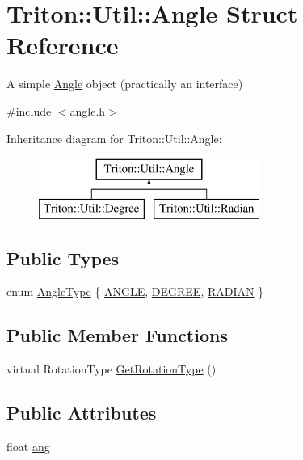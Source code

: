 \hypertarget{struct_triton_1_1_util_1_1_angle}{}\section{Triton\+:\+:Util\+:\+:Angle Struct Reference}
\label{struct_triton_1_1_util_1_1_angle}


A simple \hyperlink{struct_triton_1_1_util_1_1_angle}{Angle} object (practically an interface)  




{\ttfamily \#include $<$angle.\+h$>$}

Inheritance diagram for Triton\+:\+:Util\+:\+:Angle\+:\begin{figure}[H]
\begin{center}
\leavevmode
\includegraphics[height=2.000000cm]{struct_triton_1_1_util_1_1_angle}
\end{center}
\end{figure}
\subsection*{Public Types}
\begin{DoxyCompactItemize}
\item 
enum \hyperlink{group__lus__angle_ga38b6255184f9399841fa0b1d6bc4aa78}{Angle\+Type} \{ \hyperlink{group__lus__angle_gga38b6255184f9399841fa0b1d6bc4aa78ad5d37fcf38efdf957daee93ae0926788}{A\+N\+G\+L\+E}, 
\hyperlink{group__lus__angle_gga38b6255184f9399841fa0b1d6bc4aa78a65f1c5d48e03bd1de5960ba56db879dd}{D\+E\+G\+R\+E\+E}, 
\hyperlink{group__lus__angle_gga38b6255184f9399841fa0b1d6bc4aa78ada225beb0b39ac1224bf25804e15e08a}{R\+A\+D\+I\+A\+N}
 \}
\end{DoxyCompactItemize}
\subsection*{Public Member Functions}
\begin{DoxyCompactItemize}
\item 
virtual Rotation\+Type \hyperlink{struct_triton_1_1_util_1_1_angle_ac62cfbc48317457ff0992bc994f94f3e}{Get\+Rotation\+Type} ()
\end{DoxyCompactItemize}
\subsection*{Public Attributes}
\begin{DoxyCompactItemize}
\item 
float \hyperlink{struct_triton_1_1_util_1_1_angle_af7d7f20a28c150b09776a35bc1dae0c4}{ang}
\end{DoxyCompactItemize}


